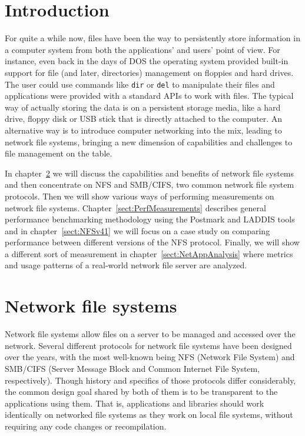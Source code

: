 \section{Introduction}

For quite a while now, files have been the way to persistently store information in a computer system
from both the applications' and users' point of view.
For instance, even back in the days of DOS the operating system provided built-in support
for file (and later, directories) management on floppies and hard drives.
The user could use commands like \texttt{dir} or \texttt{del} to manipulate their
files and applications were provided with a standard APIs to work with files.
The typical way of actually storing the data is on a persistent storage media,
like a hard drive, floppy disk or USB stick that is directly attached to the computer.
An alternative way is to introduce computer networking into the mix, leading to
network file systems, bringing a new dimension of capabilities and challenges to file
management on the table.

In chapter~\ref{sect:NetworkFileSystems} we will discuss the capabilities
and benefits of network file systems and then concentrate on NFS and SMB/CIFS, two common
network file system protocols.
Then we will show various ways of performing measurements on network file systems.
Chapter~\ref{sect:PerfMeasurements} describes general performance benchmarking methodology
using the Postmark and LADDIS tools and in chapter~\ref{sect:NFSv41} we will focus
on a case study on comparing performance between different versions of the NFS protocol.
Finally, we will show a different sort of measurement in chapter~\ref{sect:NetAppAnalysis}
where metrics and usage patterns of a real-world network file server are analyzed.

\section{Network file systems} \label{sect:NetworkFileSystems}
Network file systems allow files on a server to be managed and accessed over the network.
Several different protocols for network file systems have been designed over the years,
with the most well-known being NFS (Network File System) and 
SMB/CIFS (Server Message Block and Common Internet File System, respectively).
Though history and specifics of those protocols differ considerably, the common design
goal shared by both of them is to be transparent to the applications using them.
That is, applications and libraries should work identically on networked file systems
as they work on local file systems, without requiring any code changes or recompilation.

